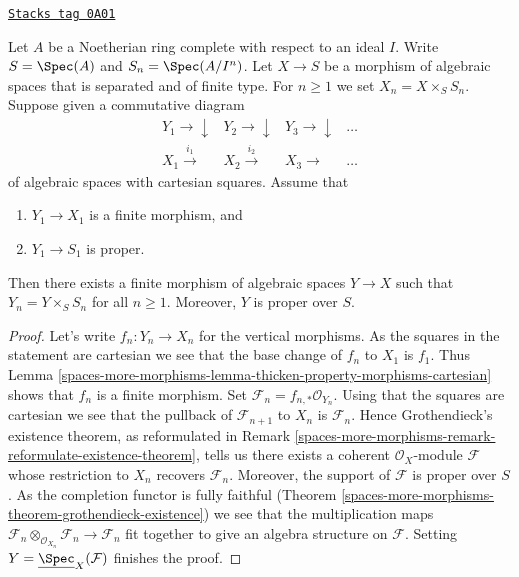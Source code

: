 \begin{lemma}
\label{spaces-more-morphisms-lemma-algebraize-formal-algebraic-space-finite-over-proper}
\href{https://stacks.math.columbia.edu/tag/0A01}{\texttt{Stacks tag 0A01}}

Let $A$ be a Noetherian ring complete with respect to an ideal $I$.
Write $S = \Spec(A)$ and $S_n = \Spec(A/I^n)$.
Let $X \to S$ be a morphism of algebraic spaces that is separated
and of finite type.
For $n \geq 1$ we set $X_n = X \times_S S_n$.
Suppose given a commutative diagram
$$
\begin{array}{cccc}Y_1 \longrightarrow\downarrow & Y_2 \longrightarrow\downarrow & Y_3 \longrightarrow\downarrow & \ldots \\ X_1 \overset{i_1}{\longrightarrow} & X_2 \overset{i_2}{\longrightarrow} & X_3 \longrightarrow & \ldots\end{array}
$$
of algebraic spaces with cartesian squares. Assume that
\begin{enumerate}
\item $Y_1 \to X_1$ is a finite morphism, and
\item $Y_1 \to S_1$ is proper.
\end{enumerate}
Then there exists a finite morphism of algebraic spaces $Y \to X$ such that
$Y_n = Y \times_S S_n$ for all $n \geq 1$. Moreover, $Y$ is proper over $S$.
\end{lemma}

\begin{proof}
Let's write $f_n : Y_n \to X_n$ for the vertical morphisms.
As the squares in the statement are cartesian
we see that the base change of $f_n$ to $X_1$ is $f_1$.
Thus Lemma \ref{spaces-more-morphisms-lemma-thicken-property-morphisms-cartesian}
shows that $f_n$ is a finite morphism.
Set $\mathcal{F}_n = f_{n, *}\mathcal{O}_{Y_n}$.
Using that the squares are cartesian we see that
the pullback of $\mathcal{F}_{n + 1}$ to $X_n$ is $\mathcal{F}_n$.
Hence Grothendieck's existence theorem, as reformulated in
Remark \ref{spaces-more-morphisms-remark-reformulate-existence-theorem},
tells us there exists a coherent $\mathcal{O}_X$-module $\mathcal{F}$
whose restriction to $X_n$ recovers $\mathcal{F}_n$.
Moreover, the support of $\mathcal{F}$ is proper over $S$.
As the completion functor is fully faithful
(Theorem \ref{spaces-more-morphisms-theorem-grothendieck-existence})
we see that the multiplication maps
$\mathcal{F}_n \otimes_{\mathcal{O}_{X_n}} \mathcal{F}_n \to
\mathcal{F}_n$ fit together to give an algebra structure on $\mathcal{F}$.
Setting $Y = \underline{\Spec}_X(\mathcal{F})$ finishes the proof.
\end{proof}

